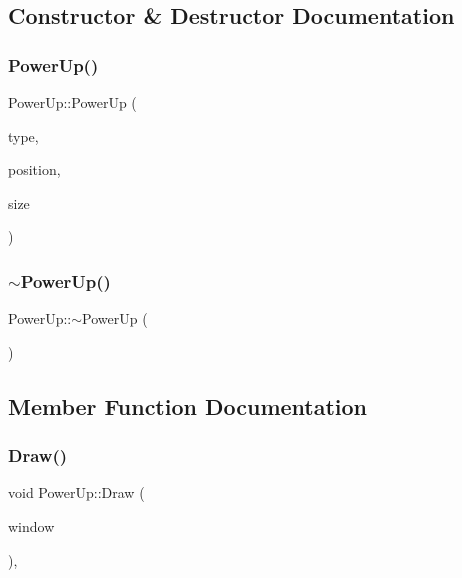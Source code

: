 \subsection{Constructor \& Destructor Documentation}
\hypertarget{class_power_up_a46d048ad5911ef25dcf55de24e8dde73}{}\label{class_power_up_a46d048ad5911ef25dcf55de24e8dde73} 
\subsubsection{\texorpdfstring{Power\+Up()}{PowerUp()}}
{\footnotesize\ttfamily Power\+Up\+::\+Power\+Up (\begin{DoxyParamCaption}\item[{int}]{type,  }\item[{sf\+::\+Vector2f}]{position,  }\item[{sf\+::\+Vector2f}]{size }\end{DoxyParamCaption})}

\hypertarget{class_power_up_a353053fe27c5a148a2fcd4f5f45e19af}{}\label{class_power_up_a353053fe27c5a148a2fcd4f5f45e19af} 
\subsubsection{\texorpdfstring{$\sim$\+Power\+Up()}{~PowerUp()}}
{\footnotesize\ttfamily Power\+Up\+::$\sim$\+Power\+Up (\begin{DoxyParamCaption}{ }\end{DoxyParamCaption})}



\subsection{Member Function Documentation}
\hypertarget{class_power_up_a0f52fe4ae4e6e47fa3fd4fb2bcc2dcb7}{}\label{class_power_up_a0f52fe4ae4e6e47fa3fd4fb2bcc2dcb7} 
\subsubsection{\texorpdfstring{Draw()}{Draw()}}
{\footnotesize\ttfamily void Power\+Up\+::\+Draw (\begin{DoxyParamCaption}\item[{sf\+::\+Render\+Window \&}]{window }\end{DoxyParamCaption})\hspace{0.3cm}{\ttfamily [override]}, {\ttfamily [virtual]}}



